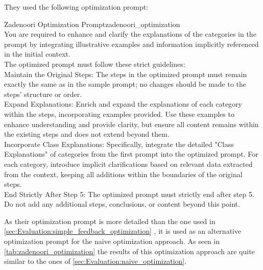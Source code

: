 They used the following optimization prompt:
\begin{prompt}{Zadenoori Optimization Prompt}{zadenoori_optimization}\\
     You are required to enhance and clarify the explanations of the categories in the prompt by integrating illustrative examples and information implicitly referenced in the initial context. \\
     The optimized prompt must follow these strict guidelines: \\
     Maintain the Original Steps: The steps in the optimized prompt must remain exactly the same as in the sample prompt; no changes should be made to the steps’ structure or order. \\
     Expand Explanations: Enrich and expand the explanations of each category within the steps, incorporating examples provided.
     Use these examples to enhance understanding and provide clarity, but ensure all content remains within the existing steps and does not extend beyond them. \\
     Incorporate Class Explanations: Specifically, integrate the detailed "Class Explanations" of categories from the first prompt into the optimized prompt.
     For each category, introduce implicit clarifications based on relevant data extracted from the context, keeping all additions within the boundaries of the original steps. \\
     End Strictly After Step 5: The optimized prompt must strictly end after step 5.
     Do not add any additional steps, conclusions, or content beyond this point. \\
\end{prompt}

As their optimization prompt is more detailed than the one used in \autoref{sec:Evaluation:simple_feedback_optimization} , it is used as an alternative optimization prompt for the naive optimization approach.
As seen in \autoref{tab:zadenoori_optimization} the results of this optimization approach are quite similar to the ones of \autoref{sec:Evaluation:naive_optimization}.
\begin{table}
    \centering
    \renewcommand{\arraystretch}{1.4}
    
    \renewcommand{\arraystretch}{1}
    \caption{Naive prompt optimization approach using the optimization prompt by \citeauthor{zadenoori2025AutomaticPrompt}}
    \label{tab:zadenoori_optimization}
\end{table}